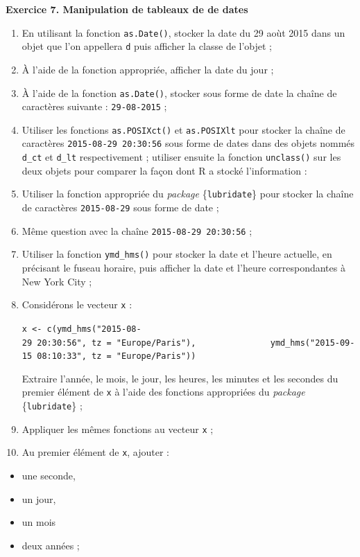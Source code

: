 \documentclass[
  11pt,
]{book}
\makeatletter
\providecommand{\tightlist}{%
  \setlength{\itemsep}{0pt}\setlength{\parskip}{0pt}}
\numberwithin{equation}{section}
\numberwithin{countremarque}{section}
\newenvironment{exframe}{%
 \def\at@end@of@exframe{}%
 \ifinner\ifhmode%
  \def\at@end@of@exframe{\end{minipage}}%
  \begin{minipage}{\columnwidth}%
 \fi\fi%
 \def\FrameCommand##1{\hskip\@totalleftmargin \hskip-\fboxsep
 \colorbox{shadecolorex}{##1}\hskip-\fboxsep
     \hskip-\linewidth \hskip-\@totalleftmargin \hskip\columnwidth}%
 \MakeFramed {\advance\hsize-\width
   \@totalleftmargin\z@ \linewidth\hsize
   \@setminipage}}%
 {\par\unskip\endMakeFramed%
 \at@end@of@exframe}
\makeatother
\begin{document}
\begin{exframe}
\textbf{Exercice 7. Manipulation de tableaux de de dates}

\begin{enumerate}
\def\labelenumi{\arabic{enumi}.}
\item
  En utilisant la fonction \texttt{as.Date()}, stocker la date du 29 aoùt 2015 dans un objet que l'on appellera \texttt{d} puis afficher la classe de l'objet ;
\item
  À l'aide de la fonction appropriée, afficher la date du jour ;
\item
  À l'aide de la fonction \texttt{as.Date()}, stocker sous forme de date la chaîne de caractères suivante : \texttt{29-08-2015} ;
\item
  Utiliser les fonctions \texttt{as.POSIXct()} et \texttt{as.POSIXlt} pour stocker la chaîne de caractères \texttt{2015-08-29\ 20:30:56} sous forme de dates dans des objets nommés \texttt{d\_ct} et \texttt{d\_lt} respectivement ; utiliser ensuite la fonction \texttt{unclass()} sur les deux objets pour comparer la façon dont R a stocké l'information :
\item
  Utiliser la fonction appropriée du \emph{package} \{\texttt{lubridate}\} pour stocker la chaîne de caractères \texttt{2015-08-29} sous forme de date ;
\item
  Même question avec la chaîne \texttt{2015-08-29\ 20:30:56} ;
\item
  Utiliser la fonction \texttt{ymd\_hms()} pour stocker la date et l'heure actuelle, en précisant le fuseau horaire, puis afficher la date et l'heure correspondantes à New York City ;
\item
  Considérons le vecteur \texttt{x} :

  \texttt{x\ \textless{}-\ c(ymd\_hms("2015-08-29\ 20:30:56",\ tz\ =\ "Europe/Paris"),\ \ \ \ \ \ \ \ \ \ \ \ \ \ \ ymd\_hms("2015-09-15\ 08:10:33",\ tz\ =\ "Europe/Paris"))}

  Extraire l'année, le mois, le jour, les heures, les minutes et les secondes du premier élément de \texttt{x} à l'aide des fonctions appropriées du \emph{package} \{\texttt{lubridate}\} ;
\item
  Appliquer les mêmes fonctions au vecteur \texttt{x} ;
\item
  Au premier élément de \texttt{x}, ajouter :
\end{enumerate}

\begin{itemize}
\tightlist
\item
  une seconde,
\item
  un jour,
\item
  un mois
\item
  deux années ;
\end{itemize}


\end{exframe}
\end{document}
